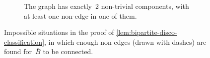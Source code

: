 \documentclass[a4paper,UKenglish,cleveref, autoref, thm-restate]{lipics-v2021}
\begin{document}
\begin{figure}[ht]
\begin{subfigure}[t]{0.3\textwidth}
    \caption{The graph has exactly~2 non-trivial components, with at least one non-edge in one of them.}
    \label{subfig:non-complete-component}
  \end{subfigure}

  \caption{Impossible situations in the proof of \cref{lem:bipartite-disco-classification},
    in which enough non-edges (drawn with dashes) are found for~$\overline{B}$ to be connected.
  }
\end{figure}
\end{document}
